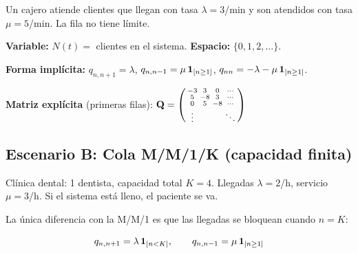 \documentclass[11pt, letterpaper]{article}
\begin{document}
\begin{ejemplobox}[Enunciado]
Un cajero atiende clientes que llegan con tasa $\lambda=3$/min y son atendidos con tasa $\mu=5$/min. La fila no tiene l\'imite.
\end{ejemplobox}

\textbf{Variable:} $N(t)=$ clientes en el sistema. \textbf{Espacio:} $\{0,1,2,\ldots\}$.

\begin{center}
\end{center}

\textbf{Forma impl\'icita:} \quad $q_{n,n+1}=\lambda$, \quad $q_{n,n-1}=\mu\,\mathbf{1}_{[n\ge1]}$, \quad $q_{nn}=-\lambda-\mu\,\mathbf{1}_{[n\ge1]}$.

\textbf{Matriz expl\'icita} (primeras filas):
$\mathbf{Q}=\begin{psmallmatrix}-3&3&0&\cdots\\5&-8&3&\cdots\\0&5&-8&\cdots\\\vdots&&&\ddots\end{psmallmatrix}$

\subsection{Escenario B: Cola M/M/1/K (capacidad finita)}

\begin{ejemplobox}[Enunciado]
Cl\'inica dental: 1 dentista, capacidad total $K=4$. Llegadas $\lambda=2$/h, servicio $\mu=3$/h. Si el sistema est\'a lleno, el paciente se va.
\end{ejemplobox}

La \'unica diferencia con la M/M/1 es que las llegadas se bloquean cuando $n=K$:

\[
q_{n,n+1}=\lambda\,\mathbf{1}_{[n<K]}, \qquad q_{n,n-1}=\mu\,\mathbf{1}_{[n\ge1]}
\]
\end{document}
